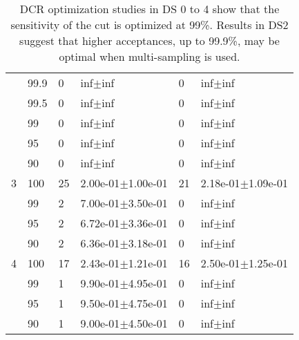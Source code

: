 \begin{table}[]
\begin{tabular}{l l | l l l l}
 &                   99.9 &       0 &                  inf$\pm$inf &                    0 &                  inf$\pm$inf \\
 &                   99.5 &       0 &                  inf$\pm$inf &                    0 &                  inf$\pm$inf \\
 &                   99 &       0 &                  inf$\pm$inf &                    0 &                  inf$\pm$inf \\
 &                   95 &       0 &                  inf$\pm$inf &                    0 &                  inf$\pm$inf \\
 &                   90 &       0 &                  inf$\pm$inf &                    0 &                  inf$\pm$inf \\
\hline              
3 &                  100 &     25 &             2.00e-01$\pm$1.00e-01 &                   21 &            2.18e-01$\pm$1.09e-01 \\
 &                   99 &      2 &             7.00e-01$\pm$3.50e-01 &                    0 &                  inf$\pm$inf \\
 &                   95 &      2 &             6.72e-01$\pm$3.36e-01 &                    0 &                  inf$\pm$inf \\
 &                   90 &      2 &             6.36e-01$\pm$3.18e-01 &                    0 &                  inf$\pm$inf \\
\hline
4 &                  100 &     17 &             2.43e-01$\pm$1.21e-01 &                   16 &             2.50e-01$\pm$1.25e-01 \\
 &                   99 &      1 &             9.90e-01$\pm$4.95e-01 &                    0 &                  inf$\pm$inf \\
 &                   95 &      1 &             9.50e-01$\pm$4.75e-01 &                    0 &                  inf$\pm$inf \\
 &                   90 &      1 &             9.00e-01$\pm$4.50e-01 &                    0 &                  inf$\pm$inf \\
\end{tabular}
 \caption[DCR optimization studies for the \DEM ]{DCR optimization studies in DS 0 to 4 show that the sensitivity of the cut is optimized at 99\%. Results in DS2 suggest that higher acceptances, up to 99.9\%, may be optimal when multi-sampling is used.} 
 \label{tab:DCR_opt}
\end{table}


